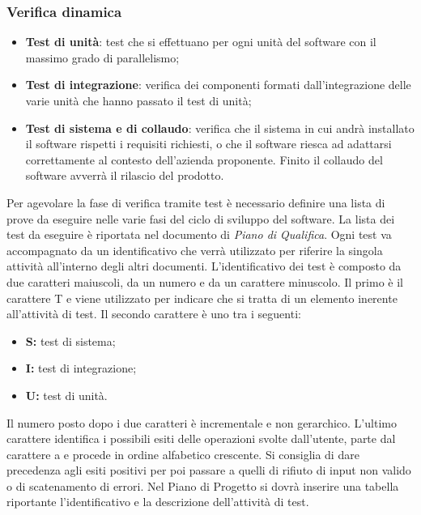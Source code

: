    \subsubsection{Verifica dinamica}  
  	\begin{itemize}
  \item \textbf{Test di unità}: test che si effettuano per ogni unità del software con il massimo grado di parallelismo;
  \item \textbf{Test di integrazione}: verifica dei componenti formati dall’integrazione delle varie unità che hanno passato il test di unità;
  \item \textbf{Test di sistema e di collaudo}: verifica che il sistema in cui andrà installato il software rispetti i requisiti richiesti, o che il software riesca ad adattarsi correttamente al contesto dell’azienda proponente. Finito il collaudo del software avverrà il rilascio del prodotto.
  \end{itemize}
  Per agevolare la fase di verifica tramite test è necessario definire una lista di prove da eseguire nelle varie fasi del ciclo di sviluppo del software.
  La lista dei test da eseguire è riportata nel documento di \emph{Piano di Qualifica}. Ogni test va accompagnato da un identificativo che verrà utilizzato per riferire
  la singola attività all’interno degli altri documenti.  L’identificativo dei test è composto da due caratteri maiuscoli, da un numero e da un carattere minuscolo. Il primo è il carattere T e viene utilizzato per indicare che si tratta di un elemento inerente all’attività di test. Il secondo carattere è uno tra i seguenti:
  \begin{itemize} 
  \item \textbf{S:} test di sistema;
  \item \textbf{I:} test di integrazione;
  \item \textbf{U:} test di unità.
  \end{itemize}
  Il numero posto dopo i due caratteri è incrementale e non gerarchico. L’ultimo carattere identifica i possibili esiti delle operazioni svolte dall’utente, parte dal carattere a e procede in ordine alfabetico crescente. Si consiglia di dare precedenza agli esiti positivi per poi passare a quelli di rifiuto di input non valido o di scatenamento di errori.
  Nel Piano di Progetto si dovrà inserire una tabella riportante l’identificativo e la descrizione dell’attività di test.
  
